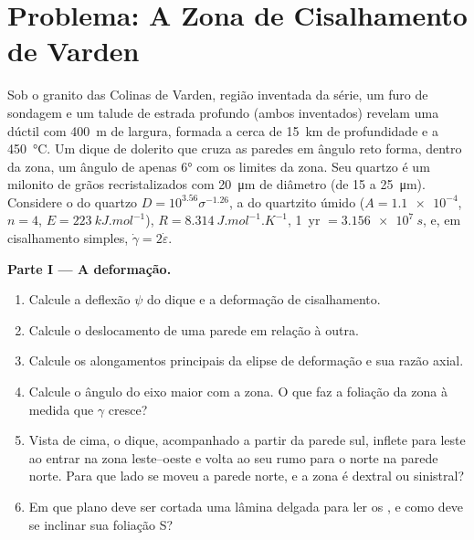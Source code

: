 \section{Problema: A Zona de Cisalhamento de Varden}

\begin{problem}
\label{pb:b3:deformation-mechanisms:1}
Sob o granito das Colinas de Varden, região inventada da série, um
furo de sondagem e um talude de estrada profundo (ambos inventados) revelam uma  dúctil
com \qty{400}{m} de largura, formada a cerca de \qty{15}{km} de profundidade e a \qty{450}{\celsius}.
Um dique de dolerito que cruza as paredes em ângulo reto forma, dentro da zona,
um ângulo de apenas \ang{6} com os limites da zona. Seu quartzo é um milonito
de grãos recristalizados com \qty{20}{\micro m} de diâmetro (de 15 a
\qty{25}{\micro m}). Considere o  do quartzo $D = 10^{3.56}\sigma^{-1.26}$,
a  do quartzito úmido ($A = \num{1.1e-4}$, $n = 4$, $E =
\qty{223}{kJ.mol^{-1}}$), $R = \qty{8.314}{J.mol^{-1}.K^{-1}}$, \qty{1}{yr} $=
\qty{3.156e7}{s}$, e, em cisalhamento simples, $\dot\gamma = 2\dot\varepsilon$.

\medskip\noindent\textbf{Parte I --- A deformação.}
\begin{enumerate}
  \item Calcule a deflexão $\psi$ do dique e a deformação de cisalhamento.
  \item Calcule o deslocamento de uma parede em relação à outra.
  \item Calcule os alongamentos principais da elipse de deformação e sua
        razão axial.
  \item Calcule o ângulo do eixo maior com a zona. O que faz a
        foliação da zona à medida que $\gamma$ cresce?
  \item Vista de cima, o dique, acompanhado a partir da parede sul, inflete para
        leste ao entrar na zona leste--oeste e volta ao seu
        rumo para o norte na parede norte. Para que lado se moveu a parede norte,
        e a zona é dextral ou sinistral?
  \item Em que plano deve ser cortada uma lâmina delgada para ler os
        , e como deve se inclinar sua foliação S?
\end{enumerate}


\end{problem}
